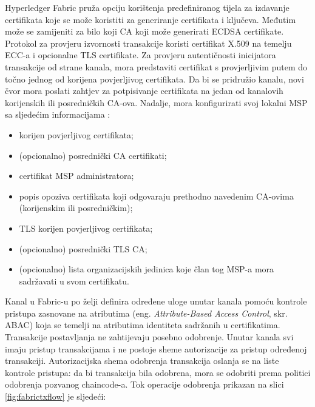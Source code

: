 \documentclass[times, utf8, diplomski]{fer}
\begin{document}
Hyperledger Fabric pruža opciju korištenja predefiniranog tijela za izdavanje certifikata koje se može koristiti za generiranje certifikata i ključeva. Međutim može se zamijeniti za bilo koji CA koji može generirati ECDSA certifikate. Protokol za provjeru izvornosti transakcije koristi certifikat X.509 na temelju ECC-a \cite{lagarde2019security} i opcionalne TLS certifikate. Za provjeru autentičnosti inicijatora transakcije od strane kanala, mora predstaviti certifikat s provjerljivim putem do točno jednog od korijena povjerljivog certifikata.  Da bi se pridružio kanalu, novi čvor mora poslati zahtjev za potpisivanje certifikata na jedan od kanalovih korijenskih ili posredničkih CA-ova. Nadalje, mora konfigurirati svoj lokalni MSP sa sljedećim informacijama \cite{lagarde2019security}:

\begin{itemize}

\item korijen povjerljivog certifikata;

\item (opcionalno) posrednički CA certifikati;

\item certifikat MSP administratora;

\item popis opoziva certifikata koji odgovaraju prethodno navedenim CA-ovima (korijenskim ili posredničkim);

\item TLS korijen povjerljivog certifikata;

\item (opcionalno) posrednički TLS CA;

\item (opcionalno) lista organizacijskih jedinica koje član tog MSP-a mora sadržavati u svom certifikatu.

\end{itemize}

Kanal u Fabric-u po želji definira određene uloge unutar kanala pomoću kontrole pristupa zasnovane na atributima (eng. \textit{Attribute-Based Access Control}, skr. ABAC) koja se temelji na atributima identiteta sadržanih u certifikatima. Transakcije postavljanja ne zahtijevaju posebno odobrenje. Unutar kanala svi imaju pristup transakcijama i ne postoje sheme autorizacije za pristup određenoj transakciji. Autorizacijska shema odobrenja transakcija oslanja se na liste kontrole pristupa: da bi transakcija bila odobrena, mora se odobriti prema politici odobrenja pozvanog chaincode-a. Tok operacije odobrenja prikazan na slici \ref{fig:fabrictxflow} je sljedeći:
\end{document}
